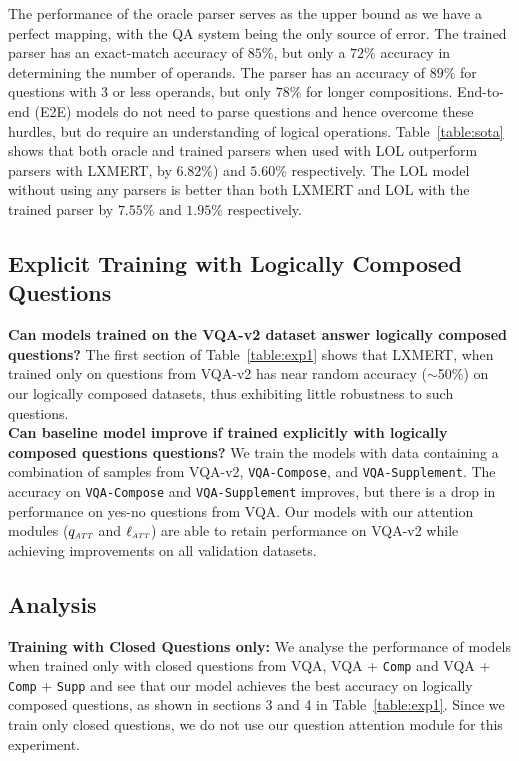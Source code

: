     The performance of the oracle parser serves as the upper bound as we have a perfect mapping, with the QA system being the only source of error.
    The trained parser has an exact-match accuracy of $85\%$, but only a $72\%$ accuracy in determining the number of operands.
    The parser has an accuracy of $89\%$ for questions with 3 or less operands, but only $78\%$ for longer compositions.
    End-to-end (E2E) models do not need to parse questions and hence overcome these hurdles, but do require an understanding of logical operations.
    Table~\ref{table:sota} shows that both oracle and trained parsers when used with LOL outperform parsers with LXMERT, by $6.82\%$) and $5.60\%$ respectively.
    The LOL model without using any parsers is better than both LXMERT and LOL with the trained parser by $7.55\%$ and $1.95\%$ respectively.

    \subsection{Explicit Training with Logically Composed Questions}
    \noindent\textbf{Can models trained on the VQA-v2 dataset answer logically composed questions?}
    The first section of Table~\ref{table:exp1} shows that LXMERT, when trained only on questions from VQA-v2 has near random accuracy ($\sim$50\%) on our logically composed datasets, thus exhibiting little robustness to such questions.\\
    
    \noindent\textbf{Can baseline model improve if trained explicitly with logically composed questions questions?}
    We train the models with data containing a combination of samples from VQA-v2, \texttt{VQA-Compose}, and \texttt{VQA-Supplement}.
    The accuracy on \texttt{VQA-Compose} and \texttt{VQA-Supplement} 
    improves, but there is a drop in performance on yes-no questions from VQA.
    Our models with our attention modules ($q_{\textit{\tiny ATT}}$ and $\ell_{\textit{\tiny ATT}}$) are able to retain performance on VQA-v2 while achieving improvements on all validation datasets.


    \subsection{Analysis}

        \noindent\textbf{Training with Closed Questions only:}
        We analyse the performance of models when trained only with closed questions from VQA, VQA + \texttt{Comp} and VQA + \texttt{Comp} + \texttt{Supp} and see that our model achieves the best accuracy on logically composed questions, as shown in sections 3 and 4 in Table~\ref{table:exp1}.
        Since we train only closed questions, we do not use our question attention module for this experiment.\\
        
